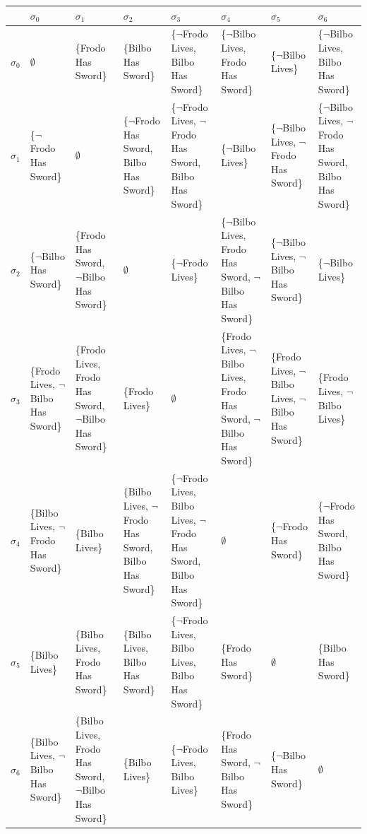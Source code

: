\documentclass[11pt,a4paper]{article}
\begin{document}
\begin{table}[]
	\centering
	\caption{Różnice między stanami}
\begin{longtable}{|p{1cm}|p{1.9cm}|p{1.9cm}|p{1.9cm}|p{1.9cm}|p{1.9cm}|p{1.9cm}|p{1.9cm}|}
\hline
     & $\sigma_0$  & $\sigma_1$ & $\sigma_2$ & $\sigma_3$ & $\sigma_4$ & $\sigma_5$ & $\sigma_6$ \\ \hline
	 $\sigma_0$ & $\emptyset$  & \{Frodo Has Sword\} & \{Bilbo Has Sword\} & \{$\neg$Frodo Lives, Bilbo Has Sword\} & \{$\neg$Bilbo Lives, Frodo Has Sword\} & \{$\neg$Bilbo Lives\} & \{$\neg$Bilbo Lives, Bilbo Has Sword\} \\ \hline
	 
     $\sigma_1$ &  \{$\neg$Frodo Has Sword\} & $\emptyset$ & \{$\neg$Frodo Has Sword, Bilbo Has Sword\}  & \{$\neg$Frodo Lives, $\neg$Frodo Has Sword, Bilbo Has Sword\}  & \{$\neg$Bilbo Lives\} & \{$\neg$Bilbo Lives, $\neg$Frodo  Has Sword\} & \{$\neg$Bilbo Lives, $\neg$Frodo Has Sword, Bilbo Has Sword\}\\ \hline
     
     $\sigma_2$ &  \{$\neg$Bilbo Has Sword\}  & \{Frodo Has Sword, $\neg$Bilbo Has Sword\} & $\emptyset$ & \{$\neg$Frodo Lives\} & \{$\neg$Bilbo Lives, Frodo Has Sword, $\neg$Bilbo Has Sword\} & \{$\neg$Bilbo Lives, $\neg$Bilbo Has Sword\} & \{$\neg$Bilbo Lives\}\\ \hline
     
     $\sigma_3$ &  \{Frodo Lives, $\neg$Bilbo Has Sword\}  & \{Frodo Lives, Frodo Has Sword, $\neg$Bilbo Has Sword\} & \{Frodo Lives\} &  $\emptyset$ & \{Frodo Lives, $\neg$Bilbo Lives, Frodo Has Sword, $\neg$Bilbo Has Sword\} & \{Frodo Lives, $\neg$Bilbo Lives, $\neg$Bilbo Has Sword\} & \{Frodo Lives, $\neg$Bilbo Lives\} \\ \hline
     
     $\sigma_4$ &  \{Bilbo Lives, $\neg$Frodo Has Sword\}  & \{Bilbo Lives\} & \{Bilbo Lives, $\neg$Frodo Has Sword, Bilbo Has Sword\} & \{$\neg$Frodo Lives, Bilbo Lives, $\neg$Frodo Has Sword, Bilbo Has Sword\} & $\emptyset$ &\{$\neg$Frodo Has Sword\} & \{$\neg$Frodo Has Sword, Bilbo Has Sword\}  \\ \hline
     
     $\sigma_5$ &  \{Bilbo Lives\}  & \{Bilbo Lives, Frodo Has Sword\} & \{Bilbo Lives, Bilbo Has Sword\} & \{$\neg$Frodo Lives, Bilbo Lives, Bilbo Has Sword\} & \{Frodo Has Sword\} & $\emptyset$ & \{Bilbo Has Sword\} \\ \hline
     
     $\sigma_6$ &  \{Bilbo Lives, $\neg$Bilbo Has Sword\} & \{Bilbo Lives, Frodo Has Sword, $\neg$Bilbo Has Sword\} & \{Bilbo Lives\} & \{$\neg$Frodo Lives, Bilbo Lives\} & \{Frodo Has Sword, $\neg$Bilbo Has Sword\} & \{$\neg$Bilbo Has Sword\} & $\emptyset$\\ \hline
\end{longtable}
\end{table}
 
\end{document}
